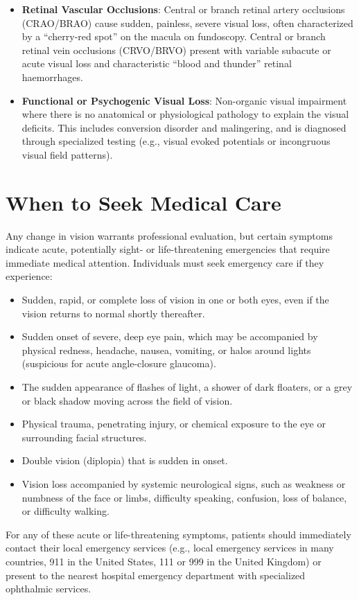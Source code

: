 \begin{itemize}
    \item \textbf{Retinal Vascular Occlusions}: Central or branch retinal artery occlusions (CRAO/BRAO) cause sudden, painless, severe visual loss, often characterized by a ``cherry-red spot'' on the macula on fundoscopy. Central or branch retinal vein occlusions (CRVO/BRVO) present with variable subacute or acute visual loss and characteristic ``blood and thunder'' retinal haemorrhages.
    \item \textbf{Functional or Psychogenic Visual Loss}: Non-organic visual impairment where there is no anatomical or physiological pathology to explain the visual deficits. This includes conversion disorder and malingering, and is diagnosed through specialized testing (e.g., visual evoked potentials or incongruous visual field patterns).
\end{itemize}

\section*{When to Seek Medical Care}
Any change in vision warrants professional evaluation, but certain symptoms indicate acute, potentially sight- or life-threatening emergencies that require immediate medical attention. Individuals must seek emergency care if they experience:
\begin{itemize}
    \item Sudden, rapid, or complete loss of vision in one or both eyes, even if the vision returns to normal shortly thereafter.
    \item Sudden onset of severe, deep eye pain, which may be accompanied by physical redness, headache, nausea, vomiting, or halos around lights (suspicious for acute angle-closure glaucoma).
    \item The sudden appearance of flashes of light, a shower of dark floaters, or a grey or black shadow moving across the field of vision.
    \item Physical trauma, penetrating injury, or chemical exposure to the eye or surrounding facial structures.
    \item Double vision (diplopia) that is sudden in onset.
    \item Vision loss accompanied by systemic neurological signs, such as weakness or numbness of the face or limbs, difficulty speaking, confusion, loss of balance, or difficulty walking.
\end{itemize}
For any of these acute or life-threatening symptoms, patients should immediately contact their local emergency services (e.g., local emergency services in many countries, 911 in the United States, 111 or 999 in the United Kingdom) or present to the nearest hospital emergency department with specialized ophthalmic services.

